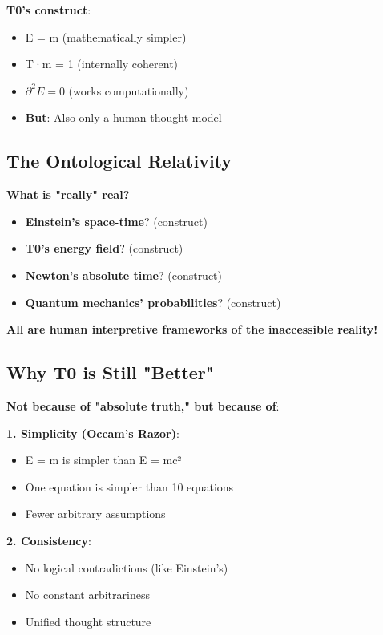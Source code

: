 \documentclass[12pt,a4paper]{article}
\begin{document}
	\textbf{T0's construct}:
	\begin{itemize}
		\item E = m (mathematically simpler)
		\item T·m = 1 (internally coherent)
		\item $\partial^2 E = 0$ (works computationally)
		\item \textbf{But}: Also only a human thought model
	\end{itemize}
	
	\subsection{The Ontological Relativity}
	
	\textbf{What is "really" real?}
	\begin{itemize}
		\item \textbf{Einstein's space-time}? (construct)
		\item \textbf{T0's energy field}? (construct)
		\item \textbf{Newton's absolute time}? (construct)
		\item \textbf{Quantum mechanics' probabilities}? (construct)
	\end{itemize}
	
	\textbf{All are human interpretive frameworks of the inaccessible reality!}
	
	\subsection{Why T0 is Still "Better"}
	
	\textbf{Not because of "absolute truth," but because of}:
	
	\textbf{1. Simplicity (Occam's Razor)}:
	\begin{itemize}
		\item E = m is simpler than E = mc²
		\item One equation is simpler than 10 equations
		\item Fewer arbitrary assumptions
	\end{itemize}
	
	\textbf{2. Consistency}:
	\begin{itemize}
		\item No logical contradictions (like Einstein's)
		\item No constant arbitrariness
		\item Unified thought structure
	\end{itemize}
	
\end{document}
